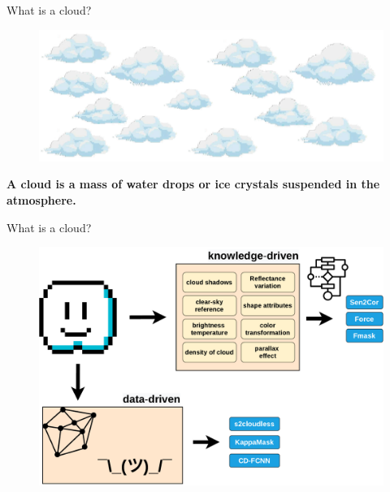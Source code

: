 \begin{frame}{What is a cloud?}
	\begin{center}
		\begin{figure}
			\centering
			\includegraphics[width=0.8\linewidth]{images/intro_fig00_0.png}
			\label{fig:introfig01}
	\end{figure}
	\vspace{20px}
	\textbf{A cloud is a mass of water drops or ice crystals suspended in the atmosphere.}	
	\end{center}
\end{frame}


\begin{frame}{What is a cloud?}
	\begin{center}
		\begin{figure}
			\centering
			\includegraphics[width=0.85\linewidth]{images/intro_what_is_a_cloud.pdf}
			\label{fig:introfig01}
		\end{figure}
	\end{center}
\end{frame}


